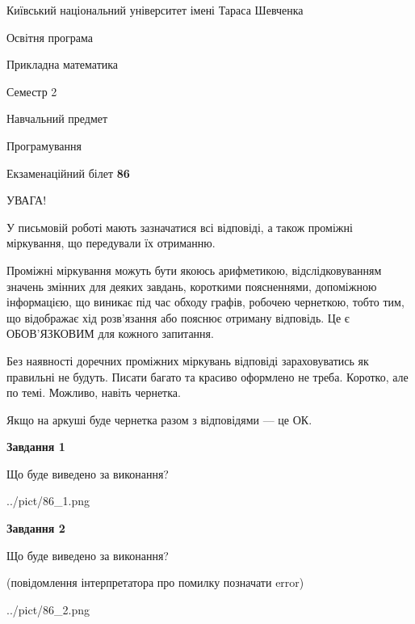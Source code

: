 \documentclass[12pt, ukrainian]{article}
\begin{document}
{{\begin {small}\par
{ \center  Київський національний університет імені Тараса Шевченка \par}
{\parbox {5 cm}{Освітня програма \hfill}{\parbox {7 cm}{Прикладна математика\hfill}}\parbox {6 cm}{\hfill Семестр 2}}\par
{\parbox {5 cm} {Навчальний предмет \hfill}\parbox {7 cm}{Програмування \hfill}\parbox {6cm}{\hfill}\par}\vspace{-7pt} \end{small}}{\center Екзаменаційний білет \No \textbf
{ 86 }\par}}
{
\begin {large}
УВАГА!

У письмовій роботі мають зазначатися всі відповіді, а також проміжні міркування, що передували їх отриманню.

Проміжні міркування можуть бути якоюсь арифметикою, відслідковуванням зна\-чень змінних для деяких завдань,
короткими поясненнями, допоміжною інформацією, що виникає під час обходу графів, робочею чернеткою,
тобто тим, що відображає хід розв’язання або пояснює отриману відповідь.
Це є ОБОВ’ЯЗКОВИМ для кожного запитання.

Без наявності доречних проміжних міркувань відповіді зараховуватись як правиль\-ні не будуть.
Писати багато та красиво оформлено не треба. Коротко, але по темі. Можли\-во, навіть чернетка.

Якщо на аркуші буде чернетка разом з відповідями --- це ОК.

\newpage

{\begin {center}\textbf{Завдання 1}\end {center}}\par
Що буде виведено за виконання?\par
\begin{center}
	{../pict/86_1.png}
\end{center}
\newpage

{\begin {center}\textbf{Завдання 2}\end {center}}\par
Що буде виведено за виконання?\par
 (повідомлення інтерпретатора про помилку позначати error)\par
\begin{center}
	{../pict/86_2.png}
\end{center}
\newpage


\end{large}}
\end{document}
